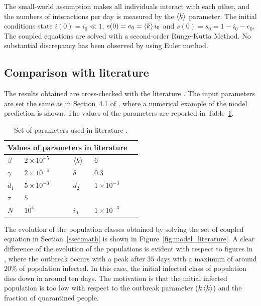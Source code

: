 The small-world assumption makes all individuals interact with each other, and the numbers of interactions per day is measured by the $\braket{k}$ parameter. The initial conditions state $i(0) = i_0 \ll 1$, $e(0) = e_0 = \braket{k}i_0$ and $s(0) = s_0 = 1-i_0-e_0$. The coupled equations are solved with a second-order Runge-Kutta Method. No substantial discrepancy has been observed by using Euler method.


\subsection{Comparison with literature}
The results obtained are cross-checked with the literature \cite{MingLiu,MingLiuOld}. The input parameters are set the same as in Section~4.1 of \cite{MingLiu}, where a numerical example of the model prediction is shown. The values of the parameters are reported in Table~\ref{tab:literature_parameters}.

\begin{table}
\centering
\begin{tabular}{@{}llllll@{}}
\toprule
\multicolumn{5}{l}{Values of parameters in literature}\\
\midrule
$\beta$ & $2\times10^{-5}$ & \phantom{aaa} & $\braket{k}$ & $6$ \\
$\gamma$ & $2\times10^{-4}$ & \phantom{aaa} & $\delta$ & $0.3$ \\
$d_1$ & $5\times10^{-3}$ & \phantom{aaa} & $d_2$ & $1\times10^{-3}$ \\
$\tau$ & $5$ & \phantom{aaa} & & \\ [2mm]
$N$ & $10^4$ & \phantom{aaa} & $i_0$ & $1\times10^{-3}$\\
\bottomrule
\end{tabular}
\caption{Set of parameters used in literature \cite{MingLiu,MingLiuOld}.}
\label{tab:literature_parameters}
\end{table}

The evolution of the population classes obtained by solving the set of coupled equation in Section~\ref{ssec:math} is shown in Figure~\ref{fig:model_literature}. A clear difference of the evolution of the populations is evident with respect to figures in \cite{MingLiu}, where the outbreak occurs with a peak after $35$ days with a maximum of around $20\%$ of population infected. In this case, the initial infected class of population dies down in around ten days. The motivation is that the initial infected population is too low with respect to the outbreak parameter ($k\braket{k}$) and the fraction of quarantined people. \\

